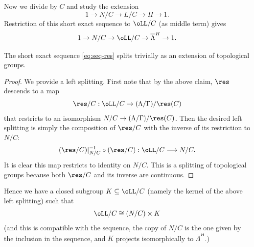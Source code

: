 Now we divide by $C$ and study the extension
\[
1\to N/C \to L/C \to H\to 1.
\]
Restriction of this short exact sequence to $\oLL/C$ (as middle term) gives
\begin{equation}\label{eq:seq-res}
1\to N/C \to \oLL/C\to \overline{\Lambda}^{H}\to 1.
\end{equation}
\begin{claim}\label{claim:l-split}
The short exact sequence \eqref{eq:seq-res} splits trivially as an extension of topological groups.
\end{claim}
\begin{proof} We provide a left splitting. First note that by the above claim, $\res$ descends to a map
\[
\res/C : \oLL/C\to (\Lambda/\Gamma)/\res(C)
\]
that restricts to an isomorphism $N/C\to (\Lambda/\Gamma)/\res(C)$. Then the desired left splitting is simply the composition of $\res/C$ with the inverse of its restriction to $N/C$:
\[
(\res/C)|_{N/C}^{-1} \circ (\res/C): \oLL/C\longrightarrow N/C.
\]
It is clear this map restricts to identity on $N/C$. This is a splitting of topological groups because both $\res/C$ and its inverse are continuous.\end{proof}
Hence we have a closed subgroup $K\subseteq \oLL/C$ (namely the kernel of the above left splitting) such that
\[
\oLL/C\cong (N/C) \times K
\]
(and this is compatible with the sequence, \ie the copy of $N/C$ is the one given by the inclusion in the sequence, and $K$ projects isomorphically to $\overline{\Lambda}^{H}$.)


